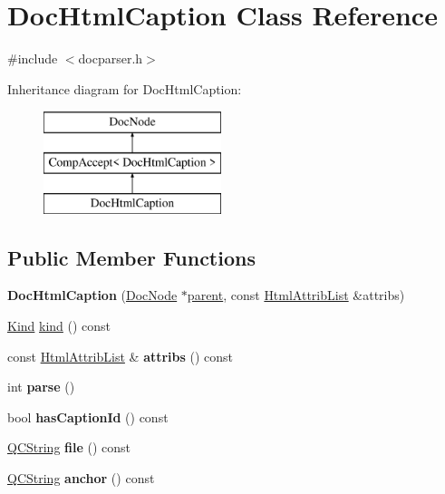 \hypertarget{class_doc_html_caption}{}\section{Doc\+Html\+Caption Class Reference}
\label{class_doc_html_caption}


{\ttfamily \#include $<$docparser.\+h$>$}

Inheritance diagram for Doc\+Html\+Caption\+:\begin{figure}[H]
\begin{center}
\leavevmode
\includegraphics[height=3.000000cm]{class_doc_html_caption}
\end{center}
\end{figure}
\subsection*{Public Member Functions}
\begin{DoxyCompactItemize}
\item 
\mbox{\label{class_doc_html_caption_aed6d882faf9ce3270760528422319bd1}} 
{\bfseries Doc\+Html\+Caption} (\mbox{\hyperlink{class_doc_node}{Doc\+Node}} $\ast$\mbox{\hyperlink{class_doc_node_a73e8ad29a91cfceb0968eb00db71a23d}{parent}}, const \mbox{\hyperlink{class_html_attrib_list}{Html\+Attrib\+List}} \&attribs)
\item 
\mbox{\hyperlink{class_doc_node_aebd16e89ca590d84cbd40543ea5faadb}{Kind}} \mbox{\hyperlink{class_doc_html_caption_a12689a3aac71b8863b9a463fa958eb79}{kind}} () const
\item 
\mbox{\label{class_doc_html_caption_a12a46be3e5ae8feb4250636215e1e2e0}} 
const \mbox{\hyperlink{class_html_attrib_list}{Html\+Attrib\+List}} \& {\bfseries attribs} () const
\item 
\mbox{\label{class_doc_html_caption_ab34c1c1fb268cd183992b15181e48013}} 
int {\bfseries parse} ()
\item 
\mbox{\label{class_doc_html_caption_a0d5624b4941b2619a268810b9123e6e0}} 
bool {\bfseries has\+Caption\+Id} () const
\item 
\mbox{\label{class_doc_html_caption_adbd4124543e897c5e2bf6120c99e83be}} 
\mbox{\hyperlink{class_q_c_string}{Q\+C\+String}} {\bfseries file} () const
\item 
\mbox{\label{class_doc_html_caption_ad71b7d8e7cff7bfb530c36f5a8eda34b}} 
\mbox{\hyperlink{class_q_c_string}{Q\+C\+String}} {\bfseries anchor} () const
\end{DoxyCompactItemize}
